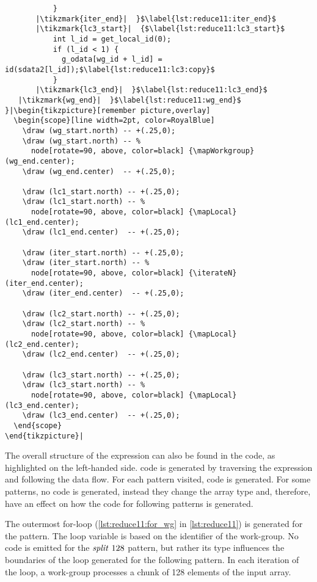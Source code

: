 \begin{lstlisting}
           }
       |\tikzmark{iter_end}|  }$\label{lst:reduce11:iter_end}$
       |\tikzmark{lc3_start}|  {$\label{lst:reduce11:lc3_start}$
           int l_id = get_local_id(0);
           if (l_id < 1) {
             g_odata[wg_id + l_id] = id(sdata2[l_id]);$\label{lst:reduce11:lc3:copy}$
           }
       |\tikzmark{lc3_end}|  }$\label{lst:reduce11:lc3_end}$
   |\tikzmark{wg_end}|  }$\label{lst:reduce11:wg_end}$
}|\begin{tikzpicture}[remember picture,overlay]
  \begin{scope}[line width=2pt, color=RoyalBlue]
    \draw (wg_start.north) -- +(.25,0);
    \draw (wg_start.north) -- %
      node[rotate=90, above, color=black] {\mapWorkgroup} (wg_end.center);
    \draw (wg_end.center)  -- +(.25,0);

    \draw (lc1_start.north) -- +(.25,0);
    \draw (lc1_start.north) -- %
      node[rotate=90, above, color=black] {\mapLocal} (lc1_end.center);
    \draw (lc1_end.center)  -- +(.25,0);

    \draw (iter_start.north) -- +(.25,0);
    \draw (iter_start.north) -- %
      node[rotate=90, above, color=black] {\iterateN} (iter_end.center);
    \draw (iter_end.center)  -- +(.25,0);

    \draw (lc2_start.north) -- +(.25,0);
    \draw (lc2_start.north) -- %
      node[rotate=90, above, color=black] {\mapLocal} (lc2_end.center);
    \draw (lc2_end.center)  -- +(.25,0);

    \draw (lc3_start.north) -- +(.25,0);
    \draw (lc3_start.north) -- %
      node[rotate=90, above, color=black] {\mapLocal} (lc3_end.center);
    \draw (lc3_end.center)  -- +(.25,0);
  \end{scope}
\end{tikzpicture}|
\end{lstlisting}
%
The overall structure of the expression can also be found in the \OpenCL code, as highlighted on the left-handed side.
\OpenCL code is generated by traversing the expression and following the data flow.
For each pattern visited, \OpenCL code is generated.
For some patterns, no code is generated, instead they change the array type and, therefore, have an effect on how the code for following patterns is generated.

The outermost for-loop (\autoref{lst:reduce11:for_wg} in \autoref{lst:reduce11}) is generated for the \mapWorkgroup pattern.
The loop variable  is based on the identifier of the work-group.
No code is emitted for the $\splitN\ 128$ pattern, but rather its type influences the boundaries of the loop generated for the following \mapWorkgroup pattern. 
In each iteration of the loop, a work-group processes a chunk of 128 elements of the input array.

